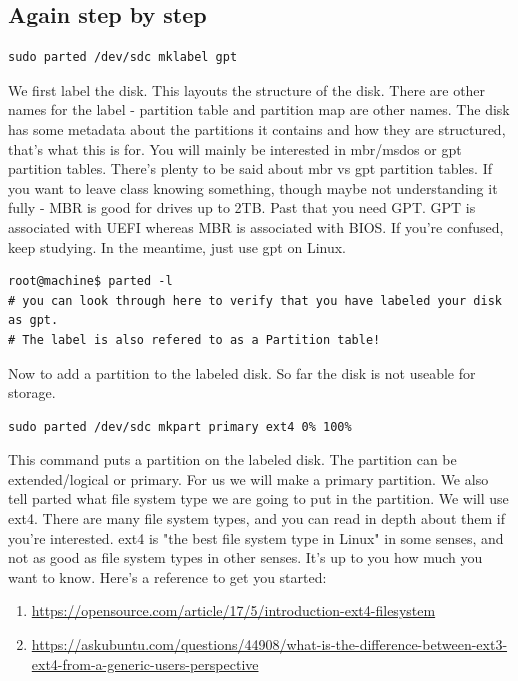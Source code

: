 \documentclass[10pt]{article}
\begin{document}
\subsection{ Again step by step}

\begin{lstlisting}
sudo parted /dev/sdc mklabel gpt
\end{lstlisting}

We first label the disk. This layouts the structure of the disk. There are other
names for the label - partition table and partition map are other names. The
disk has some metadata about the partitions it contains and how they are
structured, that's what this is for. You will mainly be interested in mbr/msdos
or gpt partition tables. There's plenty to be said about mbr vs gpt partition
tables. If you want to leave class knowing something, though maybe not
understanding it fully - MBR is good for drives up to 2TB. Past that you need
GPT. GPT is associated with UEFI whereas MBR is associated with BIOS. If you're
confused, keep studying. In the meantime, just use gpt on Linux.


\begin{lstlisting}
root@machine$ parted -l
# you can look through here to verify that you have labeled your disk as gpt.
# The label is also refered to as a Partition table!
\end{lstlisting}

Now to add a partition to the labeled disk. So far the disk is  not useable
for storage.

\begin{lstlisting}
sudo parted /dev/sdc mkpart primary ext4 0% 100%
\end{lstlisting}

This command puts a partition on the labeled disk. The partition can be
extended/logical or primary. For us we will make a primary partition. We also
tell parted what file system type we are going to put in the partition. We will
use ext4. There are many file system types, and you can read in depth about them
if you're interested. ext4 is "the best file system type in Linux" in some
senses, and not as good as file system types in other senses. It's up to you how
much you want to know. Here's a reference to get you started:

\begin{enumerate}
\item\url{https://opensource.com/article/17/5/introduction-ext4-filesystem}
\item\url{https://askubuntu.com/questions/44908/what-is-the-difference-between-ext3-ext4-from-a-generic-users-perspective}
\end{enumerate}
\end{document}
